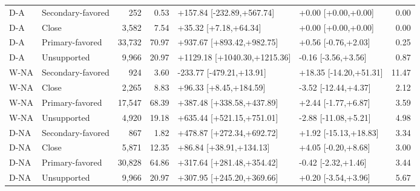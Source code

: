 \begin{table}[htbp]
\begin{tabular}{llrrllr}
D-A & Secondary-favored & 252 & 0.53 & +157.84 [-232.89,+567.74] & +0.00 [+0.00,+0.00] & 0.00\\
D-A & Close & 3,582 & 7.54 & +35.32 [+7.18,+64.34] & +0.00 [+0.00,+0.00] & 0.00\\
D-A & Primary-favored & 33,732 & 70.97 & +937.67 [+893.42,+982.75] & +0.56 [-0.76,+2.03] & 0.25\\
D-A & Unsupported & 9,966 & 20.97 & +1129.18 [+1040.30,+1215.36] & -0.16 [-3.56,+3.56] & 0.87\\
W-NA & Secondary-favored & 924 & 3.60 & -233.77 [-479.21,+13.91] & +18.35 [-14.20,+51.31] & 11.47\\
W-NA & Close & 2,265 & 8.83 & +96.33 [+8.45,+184.59] & -3.52 [-12.44,+4.37] & 2.12\\
W-NA & Primary-favored & 17,547 & 68.39 & +387.48 [+338.58,+437.89] & +2.44 [-1.77,+6.87] & 3.59\\
W-NA & Unsupported & 4,920 & 19.18 & +635.44 [+521.15,+751.01] & -2.88 [-11.08,+5.21] & 4.98\\
D-NA & Secondary-favored & 867 & 1.82 & +478.87 [+272.34,+692.72] & +1.92 [-15.13,+18.83] & 3.34\\
D-NA & Close & 5,871 & 12.35 & +86.84 [+38.91,+134.13] & +4.05 [-0.20,+8.68] & 3.00\\
D-NA & Primary-favored & 30,828 & 64.86 & +317.64 [+281.48,+354.42] & -0.42 [-2.32,+1.46] & 3.44\\
D-NA & Unsupported & 9,966 & 20.97 & +307.95 [+245.20,+369.66] & +0.20 [-3.54,+3.96] & 5.67\\
\bottomrule
\end{tabular}
\end{table}
